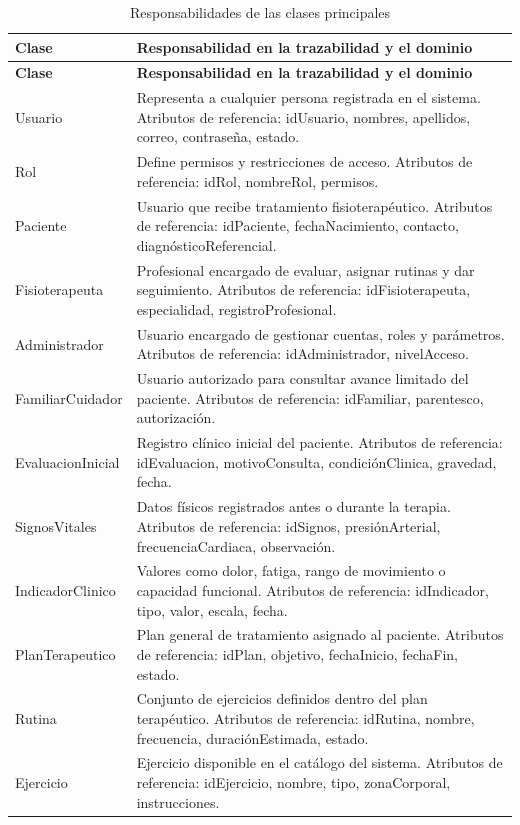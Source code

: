 \documentclass[12pt,a4paper]{article}
\begin{document}
\small
\begin{longtable}{p{}p{}}
\caption{Responsabilidades de las clases principales}\\
\toprule
\textbf{Clase}&\textbf{Responsabilidad en la trazabilidad y el dominio}\\
\midrule\endfirsthead
\toprule
\textbf{Clase}&\textbf{Responsabilidad en la trazabilidad y el dominio}\\
\midrule\endhead
Usuario & Representa a cualquier persona registrada en el sistema. Atributos de referencia: idUsuario, nombres, apellidos, correo, contraseña, estado. \\
Rol & Define permisos y restricciones de acceso. Atributos de referencia: idRol, nombreRol, permisos. \\
Paciente & Usuario que recibe tratamiento fisioterapéutico. Atributos de referencia: idPaciente, fechaNacimiento, contacto, diagnósticoReferencial. \\
Fisioterapeuta & Profesional encargado de evaluar, asignar rutinas y dar seguimiento. Atributos de referencia: idFisioterapeuta, especialidad, registroProfesional. \\
Administrador & Usuario encargado de gestionar cuentas, roles y parámetros. Atributos de referencia: idAdministrador, nivelAcceso. \\
FamiliarCuidador & Usuario autorizado para consultar avance limitado del paciente. Atributos de referencia: idFamiliar, parentesco, autorización. \\
EvaluacionInicial & Registro clínico inicial del paciente. Atributos de referencia: idEvaluacion, motivoConsulta, condiciónClinica, gravedad, fecha. \\
SignosVitales & Datos físicos registrados antes o durante la terapia. Atributos de referencia: idSignos, presiónArterial, frecuenciaCardiaca, observación. \\
IndicadorClinico & Valores como dolor, fatiga, rango de movimiento o capacidad funcional. Atributos de referencia: idIndicador, tipo, valor, escala, fecha. \\
PlanTerapeutico & Plan general de tratamiento asignado al paciente. Atributos de referencia: idPlan, objetivo, fechaInicio, fechaFin, estado. \\
Rutina & Conjunto de ejercicios definidos dentro del plan terapéutico. Atributos de referencia: idRutina, nombre, frecuencia, duraciónEstimada, estado. \\
Ejercicio & Ejercicio disponible en el catálogo del sistema. Atributos de referencia: idEjercicio, nombre, tipo, zonaCorporal, instrucciones. \\

\end{longtable}
\end{document}
